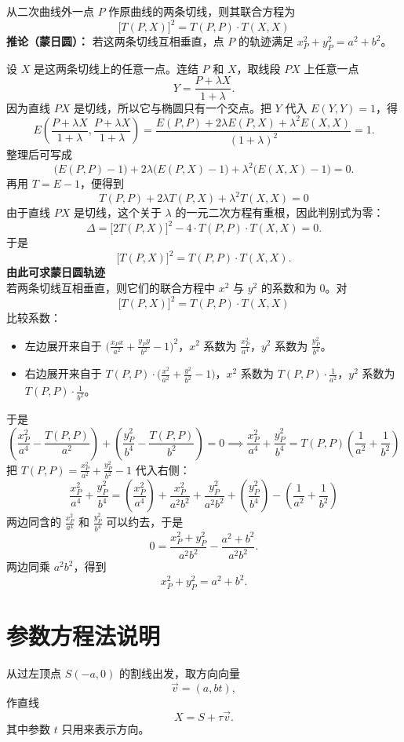 \begin{conclusion}[外切线对联合方程与蒙日圆]
    从二次曲线外一点 $P$ 作原曲线的两条切线，则其联合方程为
    $$ \big[T(P,X)\big]^2 = T(P,P) \cdot T(X,X) $$
    \textbf{推论（蒙日圆）：} 若这两条切线互相垂直，点 $P$ 的轨迹满足 $x_P^2 + y_P^2 = a^2 + b^2$。
\end{conclusion}
设 $X$ 是这两条切线上的任意一点。连结 $P$ 和 $X$，取线段 $PX$ 上任意一点
\[
Y = \frac{P + \lambda X}{1+\lambda}.
\]
因为直线 $PX$ 是切线，所以它与椭圆只有一个交点。把 $Y$ 代入 $E(Y,Y)=1$，得
\[
E\left(\frac{P+\lambda X}{1+\lambda}, \frac{P+\lambda X}{1+\lambda}\right) = \frac{E(P,P) + 2\lambda E(P,X) + \lambda^2 E(X,X)}{(1+\lambda)^2} = 1.
\]
整理后可写成
\[
\big(E(P,P) - 1\big) + 2\lambda \big(E(P,X) - 1\big) + \lambda^2 \big(E(X,X) - 1\big) = 0.
\]
再用 $T = E - 1$，便得到
$$ T(P,P) + 2\lambda T(P,X) + \lambda^2 T(X,X) = 0 $$
由于直线 $PX$ 是切线，这个关于 $\lambda$ 的一元二次方程有重根，因此判别式为零：
\[
\Delta = \big[2T(P,X)\big]^2 - 4 \cdot T(P,P) \cdot T(X,X) = 0.
\]
于是
\[
\big[T(P,X)\big]^2 = T(P,P) \cdot T(X,X).
\]
\textbf{由此可求蒙日圆轨迹}\\
若两条切线互相垂直，则它们的联合方程中 $x^2$ 与 $y^2$ 的系数和为 $0$。对
\[
\big[T(P,X)\big]^2 = T(P,P) \cdot T(X,X)
\]
比较系数：
\begin{itemize}
\item 左边展开来自于 $\big(\frac{x_P x}{a^2} + \frac{y_P y}{b^2} - 1\big)^2$，$x^2$ 系数为 $\frac{x_P^2}{a^4}$，$y^2$ 系数为 $\frac{y_P^2}{b^4}$。
\item 右边展开来自于 $T(P,P) \cdot \big(\frac{x^2}{a^2} + \frac{y^2}{b^2} - 1\big)$，$x^2$ 系数为 $T(P,P)\cdot\frac{1}{a^2}$，$y^2$ 系数为 $T(P,P)\cdot\frac{1}{b^2}$。
\end{itemize}
于是
$$ \left( \frac{x_P^2}{a^4} - \frac{T(P,P)}{a^2} \right) + \left( \frac{y_P^2}{b^4} - \frac{T(P,P)}{b^2} \right) = 0 \implies \frac{x_P^2}{a^4} + \frac{y_P^2}{b^4} = T(P,P)\left(\frac{1}{a^2} + \frac{1}{b^2}\right) $$
把 $T(P,P) = \frac{x_P^2}{a^2} + \frac{y_P^2}{b^2} - 1$ 代入右侧：
$$ \frac{x_P^2}{a^4} + \frac{y_P^2}{b^4} = {\left(\frac{x_P^2}{a^4}\right)} + \frac{x_P^2}{a^2 b^2} + \frac{y_P^2}{a^2 b^2} + {\left(\frac{y_P^2}{b^4}\right)} - \left(\frac{1}{a^2} + \frac{1}{b^2}\right) $$
两边同含的 $\frac{x_P^2}{a^4}$ 和 $\frac{y_P^2}{b^4}$ 可以约去，于是
\[
0 = \frac{x_P^2 + y_P^2}{a^2 b^2} - \frac{a^2+b^2}{a^2 b^2}.
\]
两边同乘 $a^2b^2$，得到
\[
x_P^2 + y_P^2 = a^2 + b^2.
\]


\section{参数方程法说明}
从过左顶点 $S(-a,0)$ 的割线出发，取方向向量
\[
\vec{v} = (a, bt),
\]
作直线
\[
X=S+\tau \vec{v}.
\]
其中参数 $t$ 只用来表示方向。

